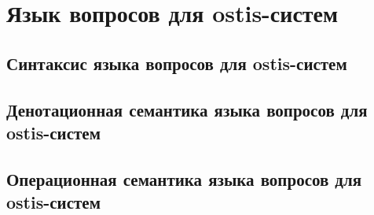 \chapter{Язык вопросов для ostis-систем}
\label{chapter_requests}


\section{Синтаксис языка вопросов для ostis-систем}
\section{Денотационная семантика языка вопросов для ostis-систем}
\section{Операционная семантика языка вопросов для ostis-систем}

%